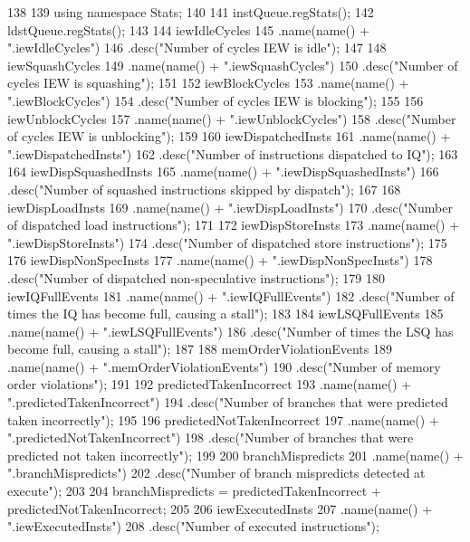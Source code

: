 \begin{DoxyCode}
138 {
139     using namespace Stats;
140 
141     instQueue.regStats();
142     ldstQueue.regStats();
143 
144     iewIdleCycles
145         .name(name() + ".iewIdleCycles")
146         .desc("Number of cycles IEW is idle");
147 
148     iewSquashCycles
149         .name(name() + ".iewSquashCycles")
150         .desc("Number of cycles IEW is squashing");
151 
152     iewBlockCycles
153         .name(name() + ".iewBlockCycles")
154         .desc("Number of cycles IEW is blocking");
155 
156     iewUnblockCycles
157         .name(name() + ".iewUnblockCycles")
158         .desc("Number of cycles IEW is unblocking");
159 
160     iewDispatchedInsts
161         .name(name() + ".iewDispatchedInsts")
162         .desc("Number of instructions dispatched to IQ");
163 
164     iewDispSquashedInsts
165         .name(name() + ".iewDispSquashedInsts")
166         .desc("Number of squashed instructions skipped by dispatch");
167 
168     iewDispLoadInsts
169         .name(name() + ".iewDispLoadInsts")
170         .desc("Number of dispatched load instructions");
171 
172     iewDispStoreInsts
173         .name(name() + ".iewDispStoreInsts")
174         .desc("Number of dispatched store instructions");
175 
176     iewDispNonSpecInsts
177         .name(name() + ".iewDispNonSpecInsts")
178         .desc("Number of dispatched non-speculative instructions");
179 
180     iewIQFullEvents
181         .name(name() + ".iewIQFullEvents")
182         .desc("Number of times the IQ has become full, causing a stall");
183 
184     iewLSQFullEvents
185         .name(name() + ".iewLSQFullEvents")
186         .desc("Number of times the LSQ has become full, causing a stall");
187 
188     memOrderViolationEvents
189         .name(name() + ".memOrderViolationEvents")
190         .desc("Number of memory order violations");
191 
192     predictedTakenIncorrect
193         .name(name() + ".predictedTakenIncorrect")
194         .desc("Number of branches that were predicted taken incorrectly");
195 
196     predictedNotTakenIncorrect
197         .name(name() + ".predictedNotTakenIncorrect")
198         .desc("Number of branches that were predicted not taken incorrectly");
199 
200     branchMispredicts
201         .name(name() + ".branchMispredicts")
202         .desc("Number of branch mispredicts detected at execute");
203 
204     branchMispredicts = predictedTakenIncorrect + predictedNotTakenIncorrect;
205 
206     iewExecutedInsts
207         .name(name() + ".iewExecutedInsts")
208         .desc("Number of executed instructions");
}
\end{DoxyCode}
